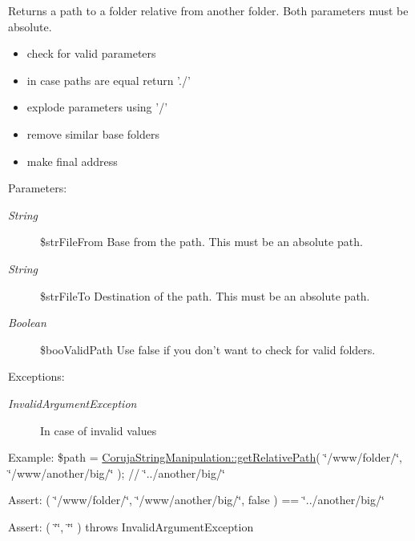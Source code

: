 Returns a path to a folder relative from another folder. Both parameters must be absolute.

\begin{itemize}
\item check for valid parameters\item in case paths are equal return './'\item explode parameters using '/'\item remove similar base folders\item make final address\end{itemize}


\begin{Desc}
\item[Parameters:]
\begin{description}
\item[{\em String}]\$strFileFrom Base from the path. This must be an absolute path. \item[{\em String}]\$strFileTo Destination of the path. This must be an absolute path. \item[{\em Boolean}]\$booValidPath Use false if you don't want to check for valid folders. \end{description}
\end{Desc}
\begin{Desc}
\item[Exceptions:]
\begin{description}
\item[{\em InvalidArgumentException}]In case of invalid values\end{description}
\end{Desc}
\begin{Desc}
\item[Example:]\$path = \hyperlink{class_coruja_string_manipulation_d93d1005c4ce820356bd2f4c0d15f6a3}{CorujaStringManipulation::getRelativePath}( \char`\"{}/www/folder/\char`\"{}, \char`\"{}/www/another/big/\char`\"{} ); // \char`\"{}../another/big/\char`\"{}\end{Desc}
\begin{Desc}
\item[Assert:]( \char`\"{}/www/folder/\char`\"{}, \char`\"{}/www/another/big/\char`\"{}, false ) == \char`\"{}../another/big/\char`\"{} \end{Desc}
\begin{Desc}
\item[Assert:]( \char`\"{}\char`\"{}, \char`\"{}\char`\"{} ) throws InvalidArgumentException \end{Desc}
